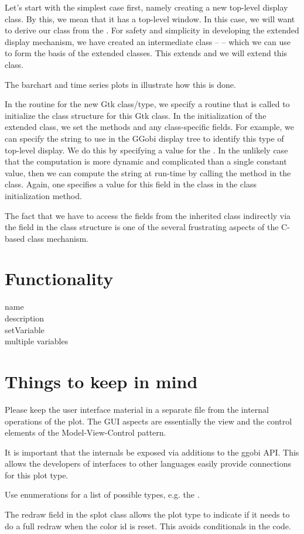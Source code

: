 \documentclass{article}
\begin{document}
Let's start with the simplest case first, namely creating a new
top-level display class.  By this, we mean that it has a top-level
window.  In this case, we will want to derive our class from the
.  For safety and simplicity in
developing the extended display mechanism, we have created an
intermediate class --  -- which
we can use to form the basis of the extended classes.  This extends
 and we will extend this class.

The barchart and time series plots in 
illustrate how this is done.

In the  routine for the new Gtk class/type, we
specify a routine that is called to initialize the class structure for
this Gtk class.  In the initialization of the extended class, we set
the methods and any class-specific fields.  For example, we can
specify the string to use in the GGobi display tree to identify this
type of top-level display.  We do this by specifying a value for the
. In the unlikely case that the computation is more
dynamic and complicated than a single constant value, then we can
compute the string at run-time by calling the 
method in the class. Again, one specifies a value for this field in
the class in the class initialization method.

The fact that we have to access the fields from the inherited class
indirectly via the  field in the class structure
is one of the several frustrating aspects of the C-based class
mechanism.


\section{Functionality}
\begin{description}
\item[name] 
\item[description]
\item[setVariable]
\item[multiple variables]
\end{description}


\section{Things to keep in mind}


Please keep the user interface material in a separate file from the
internal operations of the plot.  The GUI aspects are essentially the
view and the control elements of the Model-View-Control
pattern\cite{DesignPatterns}.

It is important that the internals be exposed via additions to the
ggobi API. This allows the developers of interfaces to other languages
easily provide connections for this plot type.

Use enumerations for a list of possible types,
e.g. the .


The redraw field in the splot class allows the plot type to indicate
if it needs to do a full redraw when the color id is reset.
This avoids conditionals in the code.
\end{document}
